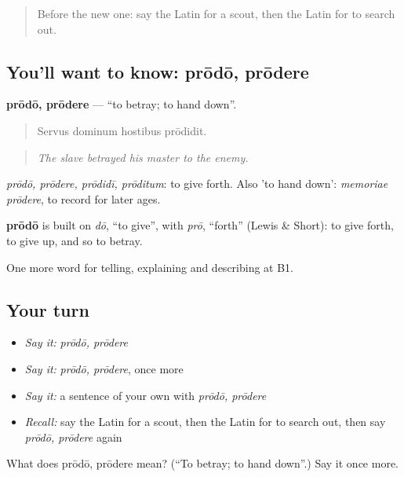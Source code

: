 \begin{quote}
Before the new one: say the Latin for a scout, then the Latin for to search out.
\end{quote}

\subsection*{You'll want to know: prōdō, prōdere}
\textbf{prōdō, prōdere} — \textquotedblleft{}to betray; to hand down\textquotedblright{}.

\begin{quote}
Servus dominum hostibus prōdidit.
\end{quote}

\begin{quote}
\emph{The slave betrayed his master to the enemy.}
\end{quote}

\emph{prōdō, prōdere, prōdidī, prōditum}: to give forth. Also 'to hand down': \emph{memoriae prōdere}, to record for later ages.

\begin{cousinweb}
\textbf{prōdō} is built on \emph{dō}, \textquotedblleft{}to give\textquotedblright{}, with \emph{prō}, \textquotedblleft{}forth\textquotedblright{} (Lewis \& Short): to give forth, to give up, and so to betray.
\end{cousinweb}

\begin{grammarlens}[title={What you've built}]
One more word for telling, explaining and describing at B1.
\end{grammarlens}

\subsection*{Your turn}
\begin{itemize}
\raggedright
  \item \emph{Say it:} \emph{prōdō, prōdere}
  \item \emph{Say it:} \emph{prōdō, prōdere}, once more
  \item \emph{Say it:} a sentence of your own with \emph{prōdō, prōdere}
  \item \emph{Recall:} say the Latin for a scout, then the Latin for to search out, then say \emph{prōdō, prōdere} again
\end{itemize}

\begin{tcolorbox}[breakable,colback=teal!4,colframe=teal!35!black,title={Before you move on}]
What does prōdō, prōdere mean? (\textquotedblleft{}To betray; to hand down\textquotedblright{}.) Say it once more.
\end{tcolorbox}
